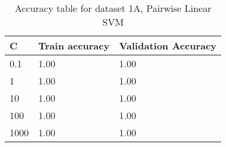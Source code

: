 \def\arraystretch{1.25}
\begin{table}[H]
\centering
\begin{tabular}{l l l }
\hline
\hline
\textbf{C} & \textbf{Train accuracy} & \textbf{Validation Accuracy} \\
\hline
\hline
0.1 & 1.00 & 1.00\\
1 & 1.00 & 1.00\\
10 & 1.00 & 1.00\\
100 & 1.00 & 1.00\\
1000 & 1.00 & 1.00\\
\hline
\end{tabular}
\caption{Accuracy table for dataset 1A, Pairwise Linear SVM}
\end{table}